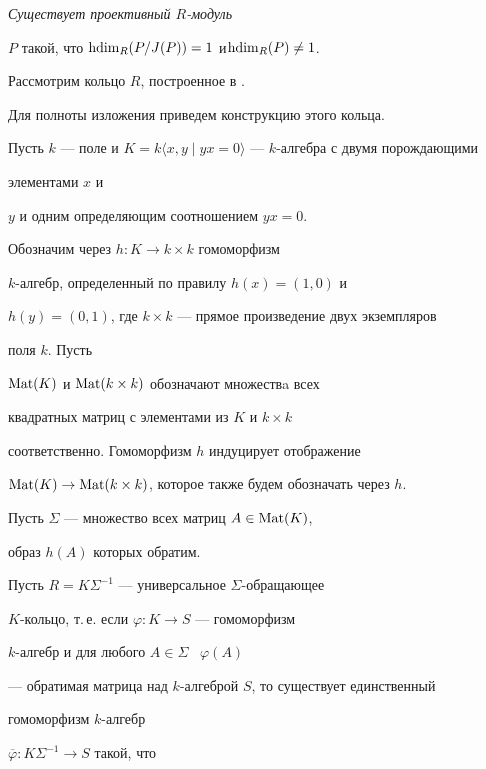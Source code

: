 \begin{exam}


{\em Существует проективный $R$-модуль 


$P$ такой, что $\operatorname{hdim}_R(P/J(P))=1$ и\linebreak $\operatorname{hdim}_R(P) \ne 1$.}


\end{exam}





Рассмотрим кольцо $R$, построенное в \cite{gerasimov}. 


Для полноты изложения приведем конструкцию этого кольца.





Пусть $k$ --- поле и $K=k\langle


x,y\mid yx=0\rangle$ --- $k$-алгебра с двумя порождающими 


элементами $x$ и


$y$ и одним определяющим соотношением $yx=0$. 


Обозначим через $h\colon K\to k\times k$ гомоморфизм


$k$-алгебр, определенный по правилу $h(x)=(1,0)$ и


$h(y)=(0,1)$, где $k \times k$ --- прямое произведение двух экземпляров


поля $k$. Пусть


$\operatorname{Mat}(K)$ и $\operatorname{Mat}(k\times k)$ обозначают множествa всех


квадратных матриц с элементами из $K$ и $k\times k$ 


соответственно. Гомоморфизм $h$ индуцирует отображение 


$\operatorname{Mat}(K) \to \operatorname{Mat}(k\times k)$, которое также будем обозначать через $h$. 


Пусть $\Sigma$ --- множество всех матриц $A\in\operatorname{Mat}(K)$, 


образ $h(A)$ которых обратим.


Пусть $R=K\Sigma^{-1}$ --- универсальное $\Sigma$-обращающее


$K$-кольцо, т.\,е. если $\varphi \colon K \to S$ --- гомоморфизм 


$k$-алгебр и для любого $A \in \Sigma$ \ $\varphi (A)$ 


--- обратимая матрица над $k$-алгеброй $S$, то существует единственный


гомоморфизм $k$-алгебр


$\overline \varphi: K\Sigma^{-1}\to S$ такой, что


